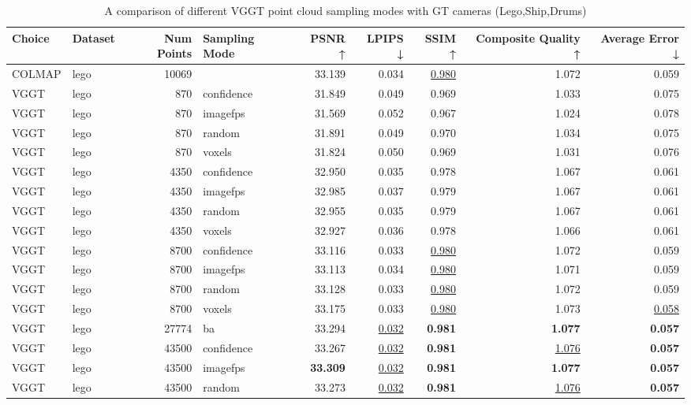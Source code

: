 \begin{table}[H]
\caption{A comparison of different VGGT point cloud sampling modes with GT cameras (Lego,Ship,Drums)}
\label{tab:03_sampling_mode_gt_cams_lego,ship,drums}
\small
\begin{tabular}{llrlrrrrr}
\toprule
Choice & Dataset & Num Points & Sampling Mode & PSNR ↑ & LPIPS ↓ & SSIM ↑ & Composite Quality ↑ & Average Error ↓ \\
\midrule
COLMAP & lego & 10069 &  & 33.139 & 0.034 & \underline{0.980} & 1.072 & 0.059 \\
VGGT & lego & 870 & confidence & 31.849 & 0.049 & 0.969 & 1.033 & 0.075 \\
VGGT & lego & 870 & imagefps & 31.569 & 0.052 & 0.967 & 1.024 & 0.078 \\
VGGT & lego & 870 & random & 31.891 & 0.049 & 0.970 & 1.034 & 0.075 \\
VGGT & lego & 870 & voxels & 31.824 & 0.050 & 0.969 & 1.031 & 0.076 \\
VGGT & lego & 4350 & confidence & 32.950 & 0.035 & 0.978 & 1.067 & 0.061 \\
VGGT & lego & 4350 & imagefps & 32.985 & 0.037 & 0.979 & 1.067 & 0.061 \\
VGGT & lego & 4350 & random & 32.955 & 0.035 & 0.979 & 1.067 & 0.061 \\
VGGT & lego & 4350 & voxels & 32.927 & 0.036 & 0.978 & 1.066 & 0.061 \\
VGGT & lego & 8700 & confidence & 33.116 & 0.033 & \underline{0.980} & 1.072 & 0.059 \\
VGGT & lego & 8700 & imagefps & 33.113 & 0.034 & \underline{0.980} & 1.071 & 0.059 \\
VGGT & lego & 8700 & random & 33.128 & 0.033 & \underline{0.980} & 1.072 & 0.059 \\
VGGT & lego & 8700 & voxels & 33.175 & 0.033 & \underline{0.980} & 1.073 & \underline{0.058} \\
VGGT & lego & 27774 & ba & 33.294 & \underline{0.032} & \textbf{0.981} & \textbf{1.077} & \textbf{0.057} \\
VGGT & lego & 43500 & confidence & 33.267 & \underline{0.032} & \textbf{0.981} & \underline{1.076} & \textbf{0.057} \\
VGGT & lego & 43500 & imagefps & \textbf{33.309} & \underline{0.032} & \textbf{0.981} & \textbf{1.077} & \textbf{0.057} \\
VGGT & lego & 43500 & random & 33.273 & \underline{0.032} & \textbf{0.981} & \underline{1.076} & \textbf{0.057} \\

\end{tabular}
\end{table}
